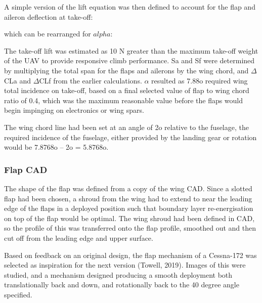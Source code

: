 \documentclass[../../main.tex]{subfiles}
\begin{document}
A simple version of the lift equation was then defined to account for the flap and aileron deflection at take-off: 


which can be rearranged for $alpha$:


The take-off lift was estimated as 10 N greater than the maximum take-off weight of the UAV to provide responsive climb performance. Sa and Sf were determined by multiplying the total span for the flaps and ailerons by the wing chord, and $\Delta$CLa and $\Delta$CLf from the earlier calculations.
$\alpha$ resulted as 7.88o required wing total incidence on take-off, based on a final selected value of flap to wing chord ratio of 0.4, which was the maximum reasonable value before the flaps would begin impinging on electronics or wing spars.

The wing chord line had been set at an angle of 2o relative to the fuselage, the required incidence of the fuselage, either provided by the landing gear or rotation would be 7.8768o – 2o = 5.8768o. 

\subsubsection{Flap CAD} \label{sec:design-process:final-design-proposal:wing:flap-cad}

The shape of the flap was defined from a copy of the wing CAD.
Since a slotted flap had been chosen, a shroud from the wing had to extend to near the leading edge of the flaps in a deployed position such that boundary layer re-energisation on top of the flap would be optimal.
The wing shroud had been defined in CAD, so the profile of this was transferred onto the flap profile, smoothed out and then cut off from the leading edge and upper surface.  

Based on feedback on an original design, the flap mechanism of a Cessna-172 was selected as inspiration for the next version (Towell, 2019).
Images of this were studied, and a mechanism designed producing a smooth deployment both translationally back and down, and rotationally back to the 40 degree angle specified. 
\end{document}

